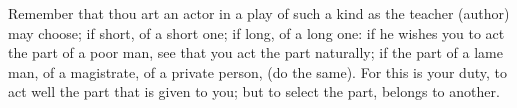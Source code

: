 Remember  that thou  art an  actor in  a play  of such  a kind  as the  teacher
(author) may choose;  if short, of a short  one; if long, of a long  one: if he
wishes you to act the part of a  poor man, see that you act the part naturally;
if the part of a lame man, of a magistrate, of a private person, (do the same).
For this is your duty, to act well the part that is given to you; but to select
the part, belongs to another.
